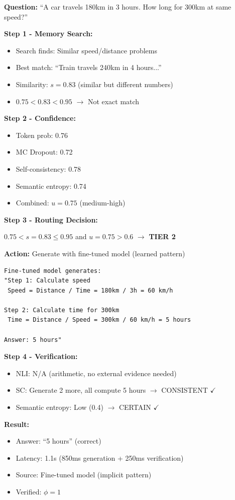 \documentclass[12pt,a4paper]{article}
\theoremstyle{definition}
\begin{document}
\begin{examplebox}[title=Tier 2: Fine-Tuned Model Generation]

\textbf{Question:} ``A car travels 180km in 3 hours. How long for 300km at same speed?''

\textbf{Step 1 - Memory Search:}
\begin{itemize}
    \item Search finds: Similar speed/distance problems
    \item Best match: ``Train travels 240km in 4 hours...''
    \item Similarity: $s = 0.83$ (similar but different numbers)
    \item $0.75 < 0.83 < 0.95$ $\rightarrow$ Not exact match
\end{itemize}

\textbf{Step 2 - Confidence:}
\begin{itemize}
    \item Token prob: 0.76
    \item MC Dropout: 0.72
    \item Self-consistency: 0.78
    \item Semantic entropy: 0.74
    \item Combined: $u = 0.75$ (medium-high)
\end{itemize}

\textbf{Step 3 - Routing Decision:}

$0.75 < s = 0.83 \leq 0.95$ and $u = 0.75 > 0.6$ $\rightarrow$ \textbf{TIER 2}

\textbf{Action:} Generate with fine-tuned model (learned pattern)

\begin{verbatim}
Fine-tuned model generates:
"Step 1: Calculate speed
 Speed = Distance / Time = 180km / 3h = 60 km/h

Step 2: Calculate time for 300km
 Time = Distance / Speed = 300km / 60 km/h = 5 hours

Answer: 5 hours"
\end{verbatim}

\textbf{Step 4 - Verification:}
\begin{itemize}
    \item NLI: N/A (arithmetic, no external evidence needed)
    \item SC: Generate 2 more, all compute 5 hours $\rightarrow$ CONSISTENT $\checkmark$
    \item Semantic entropy: Low (0.4) $\rightarrow$ CERTAIN $\checkmark$
\end{itemize}

\textbf{Result:}
\begin{itemize}
    \item Answer: ``5 hours'' (correct)
    \item Latency: 1.1s (850ms generation + 250ms verification)
    \item Source: Fine-tuned model (implicit pattern)
    \item Verified: $\phi = 1$
\end{itemize}
\end{examplebox}
\end{document}
